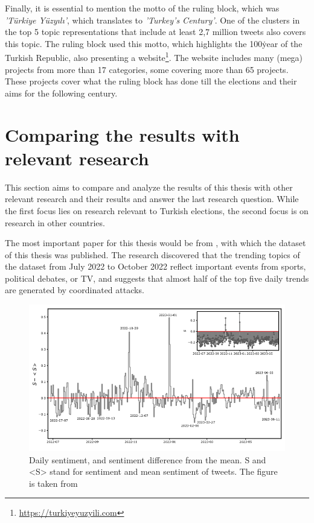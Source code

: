Finally, it is essential to mention the motto of the ruling block, which was 
\textit{'Türkiye Yüzyılı'}, which translates to \textit{'Turkey's Century'}. One of the clusters 
in the top 5 topic representations that include at least 2,7 million tweets also covers this topic. 
The ruling block used this motto, which highlights the 100\. year of the Turkish Republic, also 
presenting a website\footnote{\url{https://turkiyeyuzyili.com}}. The website includes many 
(mega) projects from more than 17 categories, some covering more than 65 projects. 
These projects cover what the ruling block has done till the elections and their aims for the 
following century.



\section{Comparing the results with relevant research}

This section aims to compare and analyze the results of this thesis with other relevant research and 
their results and answer the last research question. While the first focus lies on research relevant 
to Turkish elections, the second focus is on research in other countries.

The most important paper for this thesis would be from \textcite{secim2023}, with which the dataset 
of this thesis was published. The research discovered that the trending topics of the dataset from 
July 2022 to October 2022 reflect important events from sports, political debates, or TV, and 
suggests that almost half of the top five daily trends are generated by coordinated attacks. 

\begin{figure}[h!]
    \centering
    \includegraphics[width=\linewidth]{figures/sentiment_plot.png}
    \caption[Daily sentiment analysis]
    {Daily sentiment, and sentiment difference from the mean. S and <S> stand for sentiment and mean 
    sentiment of tweets. The figure is taken
    from \textcite{turkishbertweet_2023}}\label{fig:sentiment_analysis}
\end{figure}

